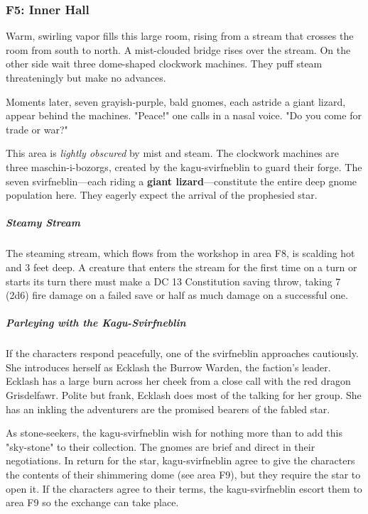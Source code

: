 \documentclass[10pt,a4paper,twoside,bg=print,twocolumn,openany,nodeprecatedcode]{dndbook}
\begin{document}
\subsubsection{F5: Inner Hall}
\begin{DndReadAloud}{}
Warm, swirling vapor fills this large room, rising from a stream that crosses the room from south to north. A mist-clouded bridge rises over the stream. On the other side wait three dome-shaped clockwork machines. They puff steam threateningly but make no advances.

Moments later, seven grayish-purple, bald gnomes, each astride a giant lizard, appear behind the machines. "Peace!" one calls in a nasal voice. "Do you come for trade or war?"

\end{DndReadAloud}

This area is \textit{lightly obscured} by mist and steam. The clockwork machines are three maschin-i-bozorgs, created by the kagu-svirfneblin to guard their forge. The seven svirfneblin—each riding a \textbf{giant lizard}—constitute the entire deep gnome population here. They eagerly expect the arrival of the prophesied star.

\subparagraph{Steamy Stream}
The steaming stream, which flows from the workshop in area F8, is scalding hot and 3 feet deep. A creature that enters the stream for the first time on a turn or starts its turn there must make a DC 13 Constitution saving throw, taking 7 (2d6) fire damage on a failed save or half as much damage on a successful one.

\subparagraph{Parleying with the Kagu-Svirfneblin}
If the characters respond peacefully, one of the svirfneblin approaches cautiously. She introduces herself as Ecklash the Burrow Warden, the faction's leader. Ecklash has a large burn across her cheek from a close call with the red dragon Grisdelfawr. Polite but frank, Ecklash does most of the talking for her group. She has an inkling the adventurers are the promised bearers of the fabled star.

As stone-seekers, the kagu-svirfneblin wish for nothing more than to add this "sky-stone" to their collection. The gnomes are brief and direct in their negotiations. In return for the star, kagu-svirfneblin agree to give the characters the contents of their shimmering dome (see area F9), but they require the star to open it. If the characters agree to their terms, the kagu-svirfneblin escort them to area F9 so the exchange can take place.
\end{document}
